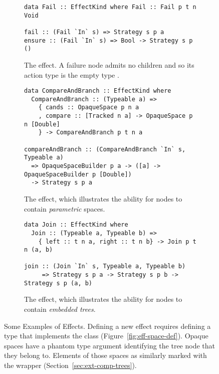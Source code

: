 \begin{figure}
\begin{subfigure}[b]{\textwidth}
\begin{lcodebox}
\begin{lstlisting}[style=haskell]
data Fail :: EffectKind where Fail :: Fail p t n Void

fail :: (Fail `In` s) => Strategy s p a
ensure :: (Fail `In` s) => Bool -> Strategy s p ()
\end{lstlisting}
\end{lcodebox}
\vspace{-0.15cm}
\caption{The  effect. A failure node admits no children and so its action type is the empty type .}\label{fig:fail-effect}
\vspace{0.3cm}
\end{subfigure}

\begin{subfigure}[b]{\textwidth}
\begin{lcodebox}
\begin{lstlisting}[style=haskell]
data CompareAndBranch :: EffectKind where
  CompareAndBranch :: (Typeable a) =>
    { cands :: OpaqueSpace p n a
    , compare :: [Tracked n a] -> OpaqueSpace p n [Double]
    } -> CompareAndBranch p t n a

compareAndBranch :: (CompareAndBranch `In` s, Typeable a)
  => OpaqueSpaceBuilder p a -> ([a] -> OpaqueSpaceBuilder p [Double])
  -> Strategy s p a
\end{lstlisting}
\end{lcodebox}
\vspace{-0.15cm}
\caption{The  effect, which illustrates the ability for nodes to contain \emph{parametric} spaces.}\label{fig:compare-and-branch-effect}
\vspace{0.3cm}
\end{subfigure}

\begin{subfigure}[b]{\textwidth}
\begin{lcodebox}
\begin{lstlisting}[style=haskell]
data Join :: EffectKind where
  Join :: (Typeable a, Typeable b) =>
    { left :: t n a, right :: t n b} -> Join p t n (a, b)

join :: (Join `In` s, Typeable a, Typeable b)
     => Strategy s p a -> Strategy s p b -> Strategy s p (a, b)
\end{lstlisting}
\end{lcodebox}
\vspace{-0.15cm}
\caption{The  effect, which illustrates the ability for nodes to contain \emph{embedded trees}.}\label{fig:join-effect}
\end{subfigure}
\caption{Some Examples of Effects. Defining a new effect requires defining a type that implements the  class (Figure~\ref{fig:eff-space-def}). Opaque spaces have a phantom type argument  identifying the tree node that they belong to. Elements of those spaces as similarly marked with the  wrapper (Section~\ref{sec:ext-comp-trees}).}\label{fig:effect-examples-short}
\end{figure}


